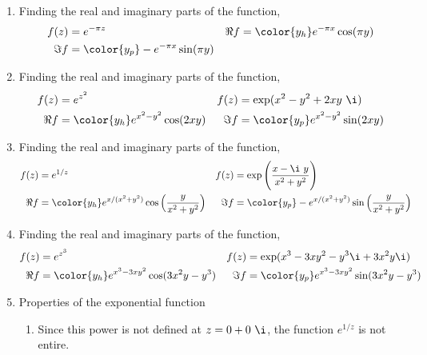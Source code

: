 \begin{enumerate}
    \item Finding the real and imaginary parts of the function,
          \begin{align}
              f(z)  & = e^{-\pi z}                          &
              \Re f & = \color{y_h} e^{-\pi x} \cos(\pi y)    \\
              \Im f & = \color{y_p} -e^{-\pi x} \sin(\pi y)
          \end{align}

    \item Finding the real and imaginary parts of the function,
          \begin{align}
              f(z)  & = e^{z^2}                             &
              f(z)  & = \exp(x^2 - y^2 + 2xy\ \i)             \\
              \Re f & = \color{y_h} e^{x^2 - y^2} \cos(2xy) &
              \Im f & = \color{y_p} e^{x^2 - y^2} \sin(2xy)
          \end{align}

    \item Finding the real and imaginary parts of the function,
          \begin{align}
              f(z)                                & = e^{1/z}                        &
              f(z)                                & = \exp\Bigg( \frac{x - \i\ y}
              {x^2 + y^2} \Bigg)                                                       \\
              \Re f                               & = \color{y_h} e^{x/(x^2 + y^2)}
              \cos\Big( \frac{y}{x^2 + y^2} \Big) &
              \Im f                               & = \color{y_p} -e^{x/(x^2 + y^2)}
              \sin\Big( \frac{y}{x^2 + y^2} \Big) &
          \end{align}

    \item Finding the real and imaginary parts of the function,
          \begin{align}
              f(z)  & = e^{z^3}                                       &
              f(z)  & = \exp(x^3 - 3xy^2 - y^3 \i + 3x^2y \i)           \\
              \Re f & = \color{y_h} e^{x^3 - 3xy^2} \cos(3x^2y - y^3) &
              \Im f & = \color{y_p} e^{x^3 - 3xy^2} \sin(3x^2y - y^3)
          \end{align}

    \item Properties of the exponential function
          \begin{enumerate}
              \item  Since this power is not defined at $ z = 0 + 0\ \i $,
                    the function $ e^{1/z} $ is \textcolor{y_p}{not entire}. \par


\end{enumerate}
\end{enumerate}
